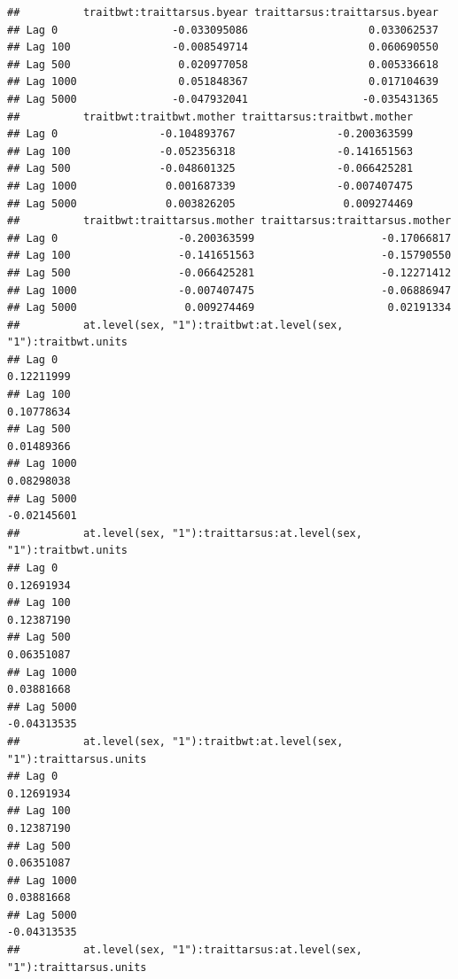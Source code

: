 \documentclass[
  12pt,
]{book}
\begin{document}
\begin{verbatim}
##          traitbwt:traittarsus.byear traittarsus:traittarsus.byear
## Lag 0                  -0.033095086                   0.033062537
## Lag 100                -0.008549714                   0.060690550
## Lag 500                 0.020977058                   0.005336618
## Lag 1000                0.051848367                   0.017104639
## Lag 5000               -0.047932041                  -0.035431365
##          traitbwt:traitbwt.mother traittarsus:traitbwt.mother
## Lag 0                -0.104893767                -0.200363599
## Lag 100              -0.052356318                -0.141651563
## Lag 500              -0.048601325                -0.066425281
## Lag 1000              0.001687339                -0.007407475
## Lag 5000              0.003826205                 0.009274469
##          traitbwt:traittarsus.mother traittarsus:traittarsus.mother
## Lag 0                   -0.200363599                    -0.17066817
## Lag 100                 -0.141651563                    -0.15790550
## Lag 500                 -0.066425281                    -0.12271412
## Lag 1000                -0.007407475                    -0.06886947
## Lag 5000                 0.009274469                     0.02191334
##          at.level(sex, "1"):traitbwt:at.level(sex, "1"):traitbwt.units
## Lag 0                                                       0.12211999
## Lag 100                                                     0.10778634
## Lag 500                                                     0.01489366
## Lag 1000                                                    0.08298038
## Lag 5000                                                   -0.02145601
##          at.level(sex, "1"):traittarsus:at.level(sex, "1"):traitbwt.units
## Lag 0                                                          0.12691934
## Lag 100                                                        0.12387190
## Lag 500                                                        0.06351087
## Lag 1000                                                       0.03881668
## Lag 5000                                                      -0.04313535
##          at.level(sex, "1"):traitbwt:at.level(sex, "1"):traittarsus.units
## Lag 0                                                          0.12691934
## Lag 100                                                        0.12387190
## Lag 500                                                        0.06351087
## Lag 1000                                                       0.03881668
## Lag 5000                                                      -0.04313535
##          at.level(sex, "1"):traittarsus:at.level(sex, "1"):traittarsus.units

\end{verbatim}
\end{document}
